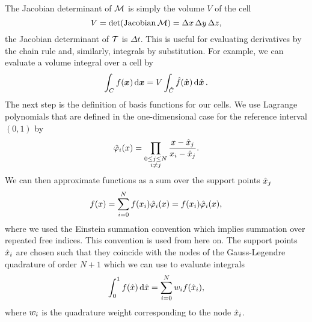 The Jacobian determinant of $\mapping$ is simply the volume $V$ of the cell
\begin{equation}
  \label{eq:determinant-mapping}
  \volume = \operatorname{det}(\operatorname{Jacobian}\mapping) = \Delta x \, \Delta y \,\Delta z,
\end{equation}
the Jacobian determinant of $\timeMapping$ is $\Delta t$.
This is useful for evaluating derivatives by the chain rule and, similarly, integrals by substitution.
For example, we can evaluate a volume integral over a cell by
\begin{equation}
  \label{eq:integration-by-substitution}
  \intdcell{
f(\bm{x})
  }
  =
\volume \intdrefcell{
    \hat{f}(\hat{\bm{x}})
  }.
\end{equation}
The next step is the definition of basis functions for our cells.
We use Lagrange polynomials that are defined in the one-dimensional case for the reference interval $(0,1)$ by
\begin{align}
  \label{eq:lagrange-basis}
    \lagrangeRef(x) = \prod_{\substack{0 \leq j \leq N \\ i \neq j}} \frac{x - {\quadNode[j]}}{x_i - \quadNode[j]}.
\end{align}
We can then approximate functions as a sum over the support points $\quadNode[j]$
\begin{equation}
  \label{eq:langrange-expansion-1d}
  f(x) = \sum_{i = 0}^N f(x_i) \lagrangeRef[i](x) = f(x_i) \lagrangeRef[i](x),
\end{equation}
where we used the Einstein summation convention which implies summation over repeated free indices.
This convention is used from here on.
The support points $\quadNode[i]$ are chosen such that they coincide with the nodes of the Gauss-Legendre quadrature of order $N+1$ which we can use to evaluate integrals
\begin{equation}
  \label{eq:quadrature-1d}
  \int_0^1 f(\hat{x}) \dd{\hat{x}} = \sum_{i=0}^{N} \quadWeight[i] f(\quadNode[i]),
\end{equation}
where $\quadWeight[i]$ is the quadrature weight corresponding to the node $\quadNode[i]$.

